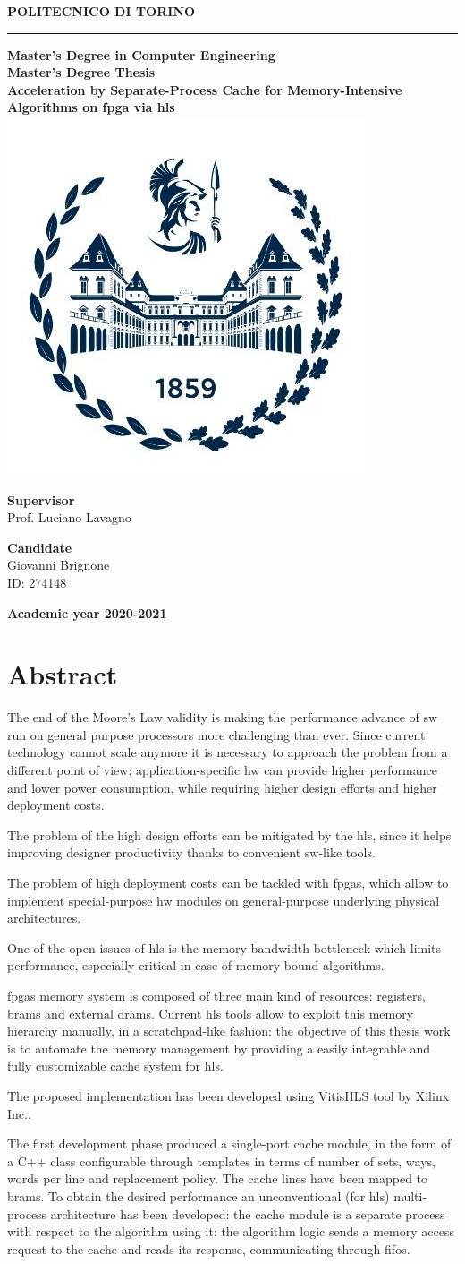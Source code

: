 \documentclass[11pt,a4paper,oneside]{memoir}
\renewcommand*{\maketitle}%
{
	\newgeometry{left=2cm,right=2cm,top=3cm,bottom=3.5cm}

	\begin{center}
		\begingroup
		{\Huge\textbf{POLITECNICO DI TORINO}}\\[\baselineskip]
		\rule{\textwidth}{2pt}\par
		\vspace*{1em}
		{\LARGE\textbf{Master's Degree in Computer Engineering}}\\[\baselineskip]
		\vspace*{1em}
		{\Large\textbf{Master's Degree Thesis}}\\
		\vspace*{2cm}
		{\huge\textbf{Acceleration by Separate-Process Cache for
		Memory-Intensive Algorithms on \acs{fpga} via \acl{hls}}}\\
		\vspace*{1cm}
		\includegraphics[width=.3\textwidth]{figures/polito-logo}
	\end{center}
	\vfill
	\begin{minipage}{0.4\textwidth}
		\begin{flushleft}
			{\Large
				\textbf{Supervisor}\\
				Prof. Luciano Lavagno
			}
		\end{flushleft}
	\end{minipage}
	\begin{minipage}{0.4\textwidth}
		\begin{flushright} 
			{\Large
				\textbf{Candidate}\\
				Giovanni Brignone\\
				ID: 274148
			}
		\end{flushright}
	\end{minipage}  
	\vspace*{2cm}
	\begin{center}
		{\Large\textbf{Academic year 2020-2021}}
	\end{center}
	\endgroup

	\restoregeometry 
}
\begin{document}
\pagestyle{empty}
\maketitle

\frontmatter
\chapter*{Abstract}
The end of the Moore's Law validity is making the performance advance of
\acl{sw} run on general purpose processors more challenging than ever.
Since current technology cannot scale anymore it is necessary to approach the
problem from a different point of view: application-specific \acl{hw} can
provide higher performance and lower power consumption, while requiring higher
design efforts and higher deployment costs.

The problem of the high design efforts can be mitigated by the \ac{hls}, since
it helps improving designer productivity thanks to convenient \acl{sw}-like
tools.

The problem of high deployment costs can be tackled with \acp{fpga}, which allow
to implement special-purpose \acl{hw} modules on general-purpose underlying
physical architectures.

\bigskip
One of the open issues of \ac{hls} is the memory bandwidth bottleneck which
limits performance, especially critical in case of memory-bound algorithms.

\acp{fpga} memory system is composed of three main kind of resources: registers,
\acp{bram} and external \acp{dram}.
Current \ac{hls} tools allow to exploit this memory hierarchy manually, in a
scratchpad-like fashion: the objective of this thesis work is to automate the
memory management by providing a easily integrable and fully customizable cache
system for \ac{hls}.

\bigskip
The proposed implementation has been developed using Vitis\texttrademark HLS
tool by Xilinx Inc..

The first development phase produced a single-port cache module, in the form of
a C++ class configurable through templates in terms of number of sets, ways,
words per line and replacement policy.
The cache lines have been mapped to \acp{bram}.
To obtain the desired performance an unconventional (for \ac{hls}) multi-process
architecture has been developed: the cache module is a separate process with
respect to the algorithm using it: the algorithm logic sends a memory access
request to the cache and reads its response, communicating through \acsp{fifo}.
\end{document}
